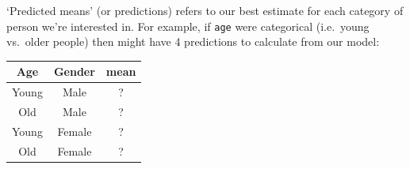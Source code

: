 \documentclass[]{article}
\theoremstyle{definition}
\theoremstyle{definition}
\theoremstyle{definition}
\theoremstyle{remark}
\begin{document}
`Predicted means' (or predictions) refers to our best estimate for each
category of person we're interested in. For example, if \texttt{age}
were categorical (i.e.~young vs.~older people) then might have 4
predictions to calculate from our model:

\begin{longtable}[]{@{}ccc@{}}
\toprule
\begin{minipage}[b]{0.10\columnwidth}\centering\strut
Age\strut
\end{minipage} & \begin{minipage}[b]{0.11\columnwidth}\centering\strut
Gender\strut
\end{minipage} & \begin{minipage}[b]{0.08\columnwidth}\centering\strut
mean\strut
\end{minipage}\tabularnewline
\midrule
\endhead
\begin{minipage}[t]{0.10\columnwidth}\centering\strut
Young\strut
\end{minipage} & \begin{minipage}[t]{0.11\columnwidth}\centering\strut
Male\strut
\end{minipage} & \begin{minipage}[t]{0.08\columnwidth}\centering\strut
?\strut
\end{minipage}\tabularnewline
\begin{minipage}[t]{0.10\columnwidth}\centering\strut
Old\strut
\end{minipage} & \begin{minipage}[t]{0.11\columnwidth}\centering\strut
Male\strut
\end{minipage} & \begin{minipage}[t]{0.08\columnwidth}\centering\strut
?\strut
\end{minipage}\tabularnewline
\begin{minipage}[t]{0.10\columnwidth}\centering\strut
Young\strut
\end{minipage} & \begin{minipage}[t]{0.11\columnwidth}\centering\strut
Female\strut
\end{minipage} & \begin{minipage}[t]{0.08\columnwidth}\centering\strut
?\strut
\end{minipage}\tabularnewline
\begin{minipage}[t]{0.10\columnwidth}\centering\strut
Old\strut
\end{minipage} & \begin{minipage}[t]{0.11\columnwidth}\centering\strut
Female\strut
\end{minipage} & \begin{minipage}[t]{0.08\columnwidth}\centering\strut
?\strut
\end{minipage}\tabularnewline
\bottomrule
\end{longtable}
\end{document}
